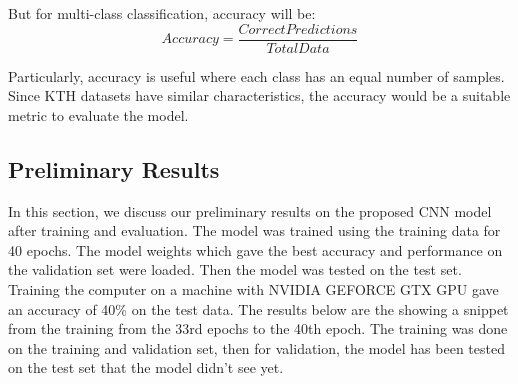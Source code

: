 But for multi-class classification, accuracy will be:
\begin{equation}
 Accuracy = \frac{Correct Predictions}{Total Data}
\end{equation}



Particularly, accuracy is useful where each class has an equal number of samples. Since KTH datasets have similar characteristics, the accuracy would be a suitable metric to evaluate the model.
\subsection {Preliminary Results}
\hspace{5mm} In this section, we discuss our preliminary results on the proposed CNN model after training and evaluation. The model was trained using the training data for 40 epochs. The model weights which gave the best accuracy and performance on the validation set were loaded. Then the model was tested on the test set. Training the computer on a machine with NVIDIA GEFORCE GTX GPU gave an accuracy of 40\% on the test data.
The results below are the showing a snippet from the training from the 33rd epochs to the 40th epoch. The training was done on the training and validation set, then for validation, the model has been tested on the test set that the model didn’t see yet.\\

